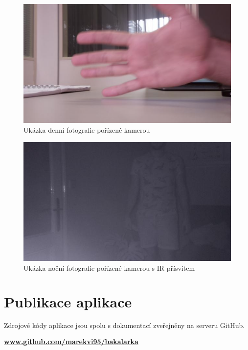 \begin{figure}[!h]
  \begin{center}
    \includegraphics[scale=0.5]{obrazky/ukazka.png}
  \end{center}
  \caption{Ukázka denní fotografie pořízené kamerou}
\end{figure}

\begin{figure}[!h]
  \begin{center}
    \includegraphics[scale=0.5]{obrazky/night_photo.jpg}
  \end{center}
  \caption{Ukázka noční fotografie pořízené kamerou s IR přísvitem}
\end{figure}

\clearpage

\section{Publikace aplikace}
Zdrojové kódy aplikace jsou spolu s dokumentací zveřejněny na serveru GitHub.

\href{www.github.com/marekvi95/bakalarka}{\textbf{www.github.com/marekvi95/bakalarka}}

